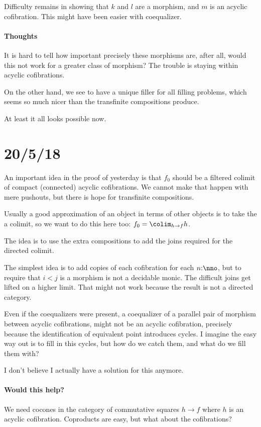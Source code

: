 \documentclass[csh.tex]{subfiles}
\begin{document}
Difficulty remains in showing that $k$ and $l$ are a morphism, and $m$ is an acyclic cofibration. This might have been easier with coequalizer.

\paragraph{Thoughts}
It is hard to tell how important precisely these morphisms are, after all, would this not work for a greater class of morphism? The trouble is staying within acyclic cofibrations.

On the other hand, we see to have a unique filler for all filling problems, which seems so much nicer than the transfinite compositions produce.

At least it all looks possible now.

\section{20/5/18}
An important idea in the proof of yesterday is that $f_0$ should be a filtered colimit of compact (connected) acyclic cofibrations. We cannot make that happen with mere pushouts, but there is hope for transfinite compositions.

Usually a good approximation of an object in terms of other objects is to take the a colimit, so we want to do this here too: $f_0 = \colim_{h\to f}h$.

The idea is to use the extra compositions to add the joins required for the directed colimit.

The simplest idea is to add copies of each cofibration for each $n\of \nno$, but to require that $i < j$ is a morphism is not a decidable monic. The difficult joins get lifted on a higher limit. That might not work because the result is not a directed category. 

Even if the coequalizers were present, a coequalizer of a parallel pair of morphism between acyclic cofibrations, might not be an acyclic cofibration, precisely because the identification of equivalent point introduces cycles. I imagine the easy way out is to fill in this cycles, but how do we catch them, and what do we fill them with?

I don't believe I actually have a solution for this anymore.

\paragraph{Would this help?}
We need cocones in the category of commutative squares $h\to f$ where $h$ is an acyclic cofibration. Coproducts are easy, but what about the cofibrations?
\end{document}
